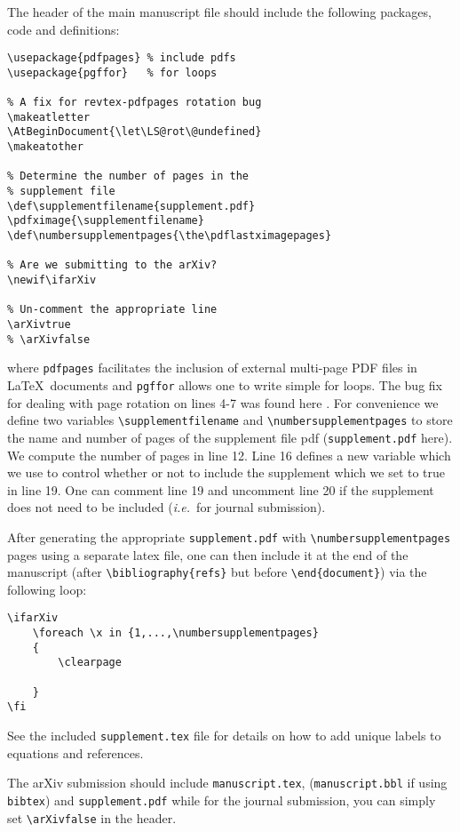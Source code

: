 \documentclass[10pt,twocolumn,prl,aps,floatfix,superscriptaddress,longbibliography]{revtex4-1}
\def\supplementfilename{supplement.pdf}
\def\numbersupplementpages{\the\pdflastximagepages}
\newif\ifarXiv
\begin{document}
The header of the main manuscript file should include the following packages,
 code and definitions:
%
\begin{lstlisting}
\usepackage{pdfpages} % include pdfs
\usepackage{pgffor}   % for loops

% A fix for revtex-pdfpages rotation bug 
\makeatletter
\AtBeginDocument{\let\LS@rot\@undefined}
\makeatother

% Determine the number of pages in the 
% supplement file
\def\supplementfilename{supplement.pdf}
\pdfximage{\supplementfilename}
\def\numbersupplementpages{\the\pdflastximagepages}

% Are we submitting to the arXiv? 
\newif\ifarXiv

% Un-comment the appropriate line
\arXivtrue 
% \arXivfalse

\end{lstlisting}
%
where \texttt{pdfpages} facilitates the inclusion of external multi-page PDF
files in \LaTeX~documents \cite{pdfpages} and \texttt{pgffor} allows one
to write simple for loops.  The bug fix for dealing with page rotation on lines
4-7 was found here \cite{rotate}. For convenience we define two variables
\verb!\supplementfilename! and \verb!\numbersupplementpages! to store the name
and number of pages of the supplement file pdf (\texttt{supplement.pdf} here).
We compute the number of pages in line 12. Line 16 defines a new variable which
we use to control whether or not to include the supplement which we set to true
in line 19.  One can comment line 19 and uncomment line 20 if the supplement
does not need to be included (\emph{i.e.}~for journal submission).

After generating the appropriate \texttt{supplement.pdf} with
\verb!\numbersupplementpages! pages using a
separate latex file, one can then include it at the end of the manuscript
(after \texttt{\textbackslash bibliography\{refs\}} but before 
\texttt{\textbackslash end\{document\}}) via the following loop: \\ 
%
\begin{lstlisting}
\ifarXiv
    \foreach \x in {1,...,\numbersupplementpages}
    {
        \clearpage
        
    }
\fi
\end{lstlisting}
%
See the included \texttt{supplement.tex} file for details on how to add unique
labels to equations and references.

The arXiv submission should include \texttt{manuscript.tex},
(\texttt{manuscript.bbl} if using \texttt{bibtex}) and
\texttt{supplement.pdf} while for the journal submission, you can simply
set \verb!\arXivfalse! in the header.



\ifarXiv
    \foreach \x in {1,...,\numbersupplementpages}
    {
        \clearpage
        
    }
\fi
\end{document}
